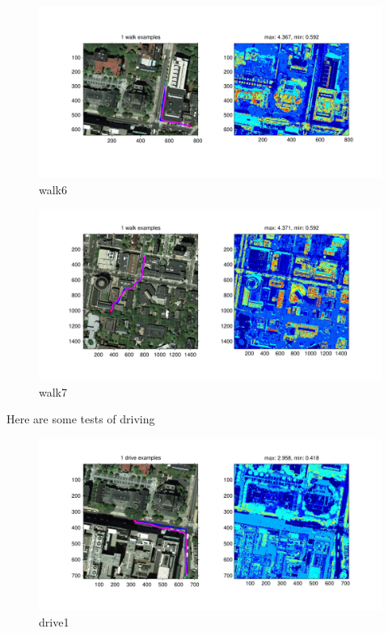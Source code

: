 \documentclass[twoside]{article}
\begin{document}
\begin{multicols}{2}
\begin{figure}[H]
\centering
\includegraphics[width=\columnwidth]{fig/walk6.pdf}
\caption{walk6}
\label{fig:walk6}
\end{figure}

\begin{figure}[H]
\centering
\includegraphics[width=\columnwidth]{fig/walk7.pdf}
\caption{walk7}
\label{fig:walk7}
\end{figure}


Here are some tests of driving
\begin{figure}[H]
\centering
\includegraphics[width=\columnwidth]{fig/drive1.pdf}
\caption{drive1}
\label{fig:drive1}
\end{figure}


\end{multicols}
\end{document}
